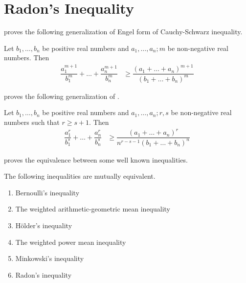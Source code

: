 \documentclass[inequalities.tex]{subfile}
\begin{document}
	\section{Radon's Inequality}\label{sec:radon}
	 \textcite{johann_radon_1913} proves the following generalization of Engel form of Cauchy-Schwarz inequality.
		\begin{theorem}\label{thm:radon}
			Let $b_{1},\ldots,b_{n}$ be positive real numbers and $a_{1},\ldots,a_{n};m$ be non-negative real numbers. Then
				\begin{align*}
					\dfrac{a_{1}^{m+1}}{b_{1}^{m}}+\ldots+\dfrac{a_{n}^{m+1}}{b_{n}^{m}}
						& \geq \dfrac{(a_{1}+\ldots+a_{n})^{m+1}}{(b_{1}+\ldots+b_{n})^{m}}
				\end{align*}
		\end{theorem}
	\textcite{yang_2002} proves the following generalization of .
		\begin{theorem}\label{thm:genradon}
			Let $b_{1},\ldots,b_{n}$ be positive real numbers and $a_{1},\ldots,a_{n};r,s$ be non-negative real numbers such that $r\geq s+1$. Then
				\begin{align*}
					\dfrac{a_{1}^{r}}{b_{1}^{s}}+\ldots+\dfrac{a_{n}^{r}}{b_{n}^{s}}
						& \geq \dfrac{(a_{1}+\ldots+a_{n})^{r}}{n^{r-s-1}(b_{1}+\ldots+b_{n})^{n}}
				\end{align*}
		\end{theorem}
	\textcite{yongtao_xian_xiao_2018} proves the equivalence between some well known inequalities.
		\begin{theorem}
			The following inequalities are mutually equivalent.
				\begin{enumerate}[\itshape i.]
					\item Bernoulli's inequality
					\item The weighted arithmetic-geometric mean inequality
					\item H\"{o}lder's inequality
					\item The weighted power mean inequality
					\item Minkowski's inequality
					\item Radon's inequality
				\end{enumerate}
		\end{theorem}
\end{document}
